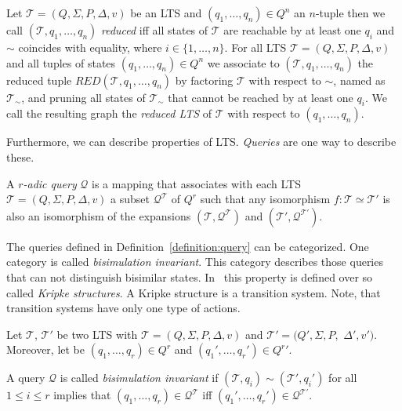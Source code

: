 \begin{definition}
    \label{definition:reduced_lts}
    Let $\mathcal{T} = (Q, \Sigma, P, \Delta, v)$ be an LTS and $(q_1, \dots, q_n) \in Q^n$ an $n$-tuple then we call $
    (\mathcal{T}, q_1, \dots, q_n)$ \emph{reduced} iff all states of $\mathcal{T}$ are reachable by at
    least one $q_i$ and $\sim$ coincides with equality, where $i \in \{1, \dots, n\}$. For all LTS $\mathcal{T} =
    (Q, \Sigma, P, \Delta, v)$ and all tuples of states $(q_1, \dots, q_n) \in Q^n$ we associate to $(\mathcal{T}, q_1,
    \dots, q_n)$ the reduced tuple $RED(\mathcal{T}, q_1, \dots, q_n)$ by factoring $\mathcal{T}$ with respect to
    $\sim$, named as $\mathcal{T}_\sim$, and pruning all states of $\mathcal{T}_\sim$ that cannot be reached by at least one $q_i$. We call the resulting
    graph the \emph{reduced LTS} of $\mathcal{T}$ with respect to $(q_1, \dots, q_n)$.
\end{definition}

Furthermore, we can describe properties of LTS. \textit{Queries} are one way to describe these.

\begin{definition}{\cite{otto1999bisimulation}}
    \label{definition:query}
    A \emph{$r$-adic query} $\mathcal{Q}$ is a mapping that associates with each LTS $\mathcal{T} = (Q, \Sigma, P,
    \Delta, v)$ a subset $\mathcal{Q}^{\mathcal{T}}$ of $Q^r$ such that any isomorphism $f:
    \mathcal{T} \simeq \mathcal{T}'$ is also an isomorphism of the expansions $(\mathcal{T}, \mathcal{Q}^{\mathcal{T}})$
    and $({\mathcal{T}}', \mathcal{Q}^{{\mathcal{T}}'})$.
\end{definition}

The queries defined in Definition~\ref{definition:query} can be categorized. One category is called \textit{bisimulation invariant}. This category describes those queries that
can not distinguish bisimilar states. In~\cite{otto1999bisimulation} this property is defined over so called
\textit{Kripke structures}. A Kripke structure is a transition system. Note, that transition systems have only one
type of actions.

\begin{definition}
    \label{definition:bisimulationInvariant}
    Let $\mathcal{T}$, $\mathcal{T}'$ be two LTS with $\mathcal{T} = (Q, \Sigma, P, \Delta, v)$
    and $\mathcal{T}' = (Q', \Sigma, P,$ $ \Delta', v')$. Moreover, let be $(q_1, \dots, q_r) \in Q^r$ and $({q_1}',
    \dots, {q_r}') \in {Q^r}'$.

    A query $\mathcal{Q}$ is called \emph{bisimulation invariant} if $(\mathcal{T}, q_i) \sim (\mathcal{T}', q_i')$
    for all $1 \leq i \leq r$ implies that $(q_1, \dots, q_r) \in \mathcal{Q}^\mathcal{T}$ iff $({q_1}',
    \dots, {q_r}') \in \mathcal{Q}^{{\mathcal{T}}'}$.
\end{definition}

